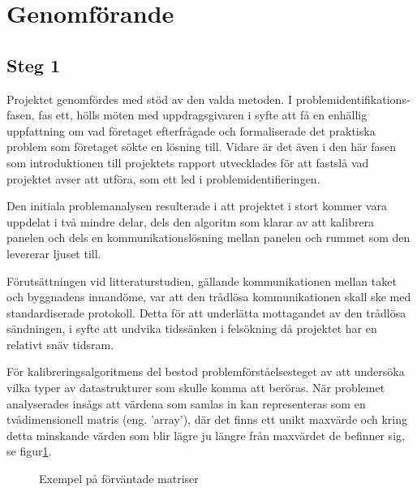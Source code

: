\section{Genomförande} %
\label{sec:genomf_rande}
    \subsection{Steg 1} %
    \label{sub:steg_1}
        Projektet genomfördes med stöd av den valda metoden. I problemidentifikations-fasen, fas ett, hölls möten med uppdragsgivaren i syfte att få en enhällig uppfattning om vad företaget efterfrågade och formaliserade det praktiska problem som företaget sökte en lösning till. Vidare är det även i den här fasen som introduktionen till projektets rapport utvecklades för att fastslå vad projektet avser att utföra, som ett led i problemidentifieringen. \bigskip

        Den initiala problemanalysen resulterade i att projektet i stort kommer vara uppdelat i två mindre delar, dels den algoritm som klarar av att kalibrera panelen och dels en kommunikationslösning mellan panelen och rummet som den levererar ljuset till. \bigskip

        Förutsättningen vid litteraturstudien, gällande kommunikationen mellan taket och byggnadens innandöme, var att den trådlösa kommunikationen skall ske med standardiserade protokoll. Detta för att underlätta mottagandet av den trådlösa sändningen, i syfte att undvika tidssänken i felsökning då projektet har en relativt snäv tidsram.\bigskip

        För kalibreringsalgoritmens del bestod problemförståelsesteget av att undersöka vilka typer av datastrukturer som skulle komma att beröras. När problemet analyserades insågs att värdena som samlas in kan representeras som en tvådimensionell matris (eng. 'array'), där det finns ett unikt maxvärde och kring detta minskande värden som blir lägre ju längre från maxvärdet de befinner sig, se figur\ref{fig:array}. \bigskip

        \begin{figure}[hbt]
        \centering
            \begin{subfigure}{0.2\textwidth}
            \end{subfigure}
            \begin{subfigure}{0.2\textwidth}
            \end{subfigure}
        \caption{\label{fig:array} Exempel på förväntade matriser}
        \end{figure}
